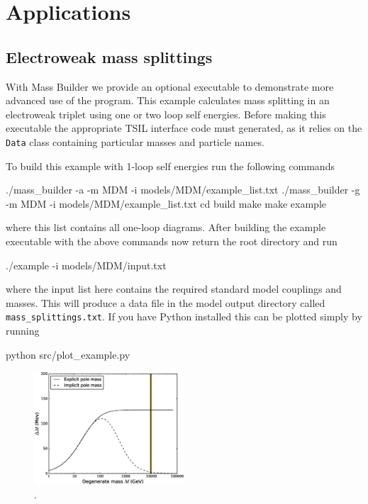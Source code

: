 \section{Applications}

\subsection{Electroweak mass splittings}

With Mass Builder we provide an optional executable to demonstrate more advanced use of the program.  This example calculates mass splitting in an electroweak triplet using one or two loop self energies.  Before making this executable the appropriate TSIL interface code must generated, as it relies on the \lstinline{Data} class containing particular masses and particle names.

To build this example with 1-loop self energies run the following commands
\begin{lstterm}
./mass_builder -a -m MDM -i models/MDM/example_list.txt
./mass_builder -g -m MDM -i models/MDM/example_list.txt
cd build
make
make example
\end{lstterm}
where this list contains all one-loop diagrams.  After building the example executable with the above commands now return the root directory and run
\begin{lstterm}
./example -i models/MDM/input.txt
\end{lstterm}
where the input list here contains the required standard model couplings and masses.  This will produce a data file in the model output directory called \lstinline{mass_splittings.txt}.  If you have Python installed this can be plotted simply by running
\begin{lstterm}
python src/plot_example.py
\end{lstterm}

\begin{figure}
\centering
\includegraphics[width=0.5\textwidth]{mass_splittings.eps}
\caption{.}\label{fig:1_loop}
\end{figure}







